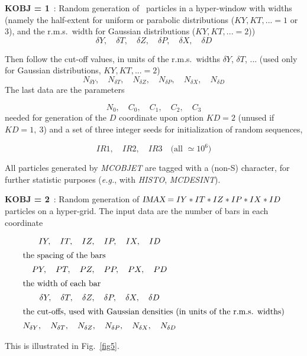 \noindent\textbf{KOBJ  =  1}~: Random  generation of \IMAX\ particles  
in a hyper-window with widths
(namely the half-extent for uniform or parabolic distributions ($KY, 
KT, ... =1$ or 3), and  the r.m.s.~width for Gaussian distributions ($KY, 
KT, ... =2$))
$$   \delta Y,\quad   \delta T,\quad   \delta Z,\quad   \delta P,\quad   \delta X,\quad  \delta D $$

\noindent Then follow the cut-off values, in units of the 
r.m.s.~widths $\delta Y$, $\delta T$, ... (used only for  Gaussian distributions,  
$KY, KT, ... =2$)
$$
	N_{\delta Y},\quad N_{\delta T},\quad N_{\delta Z},\quad N_{\delta P},\quad N_{\delta X},\quad N_{\delta D}
$$	 
\noindent The last data are the parameters 

$$ N_0,\quad C_0,\quad C_1,\quad C_2,\quad C_3 $$ 
%
 needed for generation of the $ D $ coordinate upon option
 $ KD  =  2$ (unused if $ KD = 1,~3$) and a set of three integer seeds for initialization of random sequences,
 
 $$ IR1,\quad   IR2, \quad  IR3 \quad \text{(all $\simeq 10^6 $)}$$
%

\medskip

\noindent All particles generated by \textsl{MCOBJET}  are tagged  
with a (non-S) character, for further statistic purposes 
(\emph{e.g.}, with \textsl{HISTO}, \textsl{MCDESINT}).  
\medskip

\noindent\textbf{KOBJ  =  2}~: Random  generation of 
$\textsl{IMAX} =  IY \ast   IT  \ast IZ \ast  IP  \ast  IX  \ast  ID $ particles    
 on a  hyper-grid.  The input data are the number of bars    in 
each coordinate

 \begin{gather*}
	 IY,\quad IT,\quad IZ,\quad IP,\quad IX, \quad ID \\
%
\intertext{the spacing of the bars} 
	PY,\quad PT,\quad PZ,\quad PP,\quad PX, \quad PD \\
%
\intertext{the width of each bar} 
	\delta Y,\quad \delta T,\quad \delta Z,\quad \delta P,\quad \delta X,\quad \delta D  \\
%
\intertext{the cut-offs, used with Gaussian densities (in units of the r.m.s. widths)}
	N_{\delta Y},\quad N_{\delta T},\quad N_{\delta Z},\quad N_{\delta P},\quad N_{\delta X},\quad N_{\delta D}
 \end{gather*}

\noindent This is illustrated in Fig.~\ref{fig5}.

\medskip

